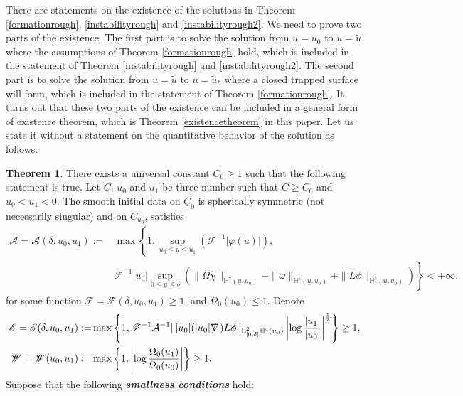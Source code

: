 \documentclass[11pt,reqno]{amsart}
\theoremstyle{definition}
\newtheorem{theorem}{Theorem}[section]
\numberwithin{equation}{section}
\renewcommand{\L}{\mathbb{L}}
\renewcommand{\H}{\mathbb{H}}
\def\chih{\widehat{\chi}}
\def\ub{\underline{u}}
\def\Cb{\underline{C}}
\newcommand{\logOmega}{\left|\log\frac{\Omega_0(u_1)}{\Omega_0(u_0)}\right|}
\newcommand{\tu}{\widetilde{u}}
\def\nablas{\mbox{$\nabla \mkern -13mu /$ }}
\begin{document}
There are statements on the existence of the solutions in Theorem \ref{formationrough}, \ref{instabilityrough} and \ref{instabilityrough2}. We need to prove two parts of the existence. The first part is to solve the solution from $u=u_0$ to $u=\tu$ where the assumptions of Theorem \ref{formationrough} hold, which is included in the statement of Theorem \ref{instabilityrough} and \ref{instabilityrough2}. The second part is to solve the solution from $u=\tu$ to $u=\tu_*$ where a closed trapped surface will form, which is included in the statement of Theorem \ref{formationrough}. It turns out that these two parts of the existence can be included in a general form of existence theorem, which is Theorem \ref{existencetheorem} in this paper. Let us state it without a statement on the quantitative behavior of the solution as follows.
\begin{theorem}\label{existencerough}
There exists a universal constant $C_0\ge1$ such that the following statement is true. Let $C$, $u_0$ and $u_1$ be three number such that $C\ge C_0$ and $u_0<u_1<0$. The smooth initial data on $\Cb_0$ is spherically symmetric (not necessarily singular) and on $C_{u_0}$, satisfies
 \begin{equation}\label{def-A-intro}
 \begin{split}
\mathcal{A}= \mathcal{A}(\delta,u_0,u_1):=&\max\left\{1,\sup_{u_0\le u\le u_1}\left(\mathscr{F}^{-1}|\varphi(u)|\right),\right.\\
 &\left.\mathscr{F}^{-1}|u_0|\sup_{0\le\ub\le\delta}\left(\|\Omega\chih\|_{\H^7(\ub,u_0)}+\|\omega\|_{\H^5(\ub,u_0)}+\|L\phi\|_{\H^5(\ub,u_0)}\right)\right\}<+\infty.
 \end{split}
 \end{equation}
for some function $\mathscr{F}=\mathscr{F}(\delta,u_0,u_1)\ge1$, and $\Omega_0(u_0)\le1$. Denote
\begin{align}
\label{def-E-intro}\mathscr{E}=\mathscr{E}(\delta,u_0,u_1):=&\max\left\{1, \mathscr{F}^{-1}\mathcal{A}^{-1}\||u_0|(|u_0|\nablas)L\phi\|_{\L^2_{[0,\delta]}\H^4(u_0)}\left|\log\frac{|u_1|}{|u_0|}\right|^{\frac{1}{2}}\right\}\ge1,\\
\label{def-W-intro}\mathscr{W}=\mathscr{W}(u_0,u_1):=&\max\left\{1,\logOmega\right\}\ge1.
\end{align}
 Suppose that the following {\bf{\emph{smallness conditions}}} hold:
\begin{align}

\end{align}
\end{theorem}
\end{document}
